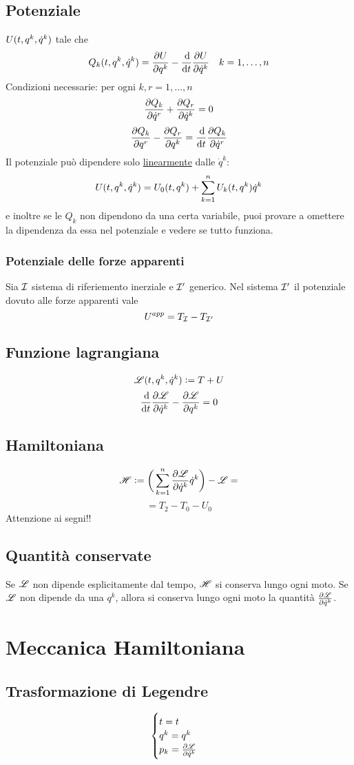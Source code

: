 \documentclass[11pt,landscape,a4paper]{article}
\begin{document}
\begin{multicols}{3}
    \subsection{Potenziale}
        $U (t, q^k, \dot q ^k)$ tale che $$ Q_k \diptre = \de{U}{q^k} - \ddt{}\de{U}{\dot q ^k} \quad k = 1,\dots,n$$
        Condizioni necessarie: per ogni $k,r = 1,\dots, n$
        $$ \frac{\partial Q_k}{\partial \dot q^r} + \frac{\partial Q_r}{\partial \dot q^k} = 0$$
        $$\de{Q_k}{q^r} - \de{Q_r}{q^k} = \ddt{}\de{Q_k}{\dot q^r}$$
        Il potenziale può dipendere solo \underline{linearmente} dalle $\dot q ^k$:
        $$ U (t, q^k, \dot q ^k) = U_0 (t, q^k) + \sum_{k=1}^n U_k (t, q^k) \dot q^k$$
        e inoltre se le $Q_k$ non dipendono da una certa variabile, puoi provare a omettere la dipendenza da essa nel potenziale e vedere se tutto funziona.
        \subsubsection{Potenziale delle forze apparenti}
        Sia $\mathcal{I}$ sistema di riferiemento inerziale e $\mathcal{I}'$ generico. Nel sistema $\mathcal{I}'$ il potenziale dovuto alle forze apparenti vale
        $$ U^{app} = T_{\mathcal{I}} - T_{\mathcal{I}'}$$
    \subsection{Funzione lagrangiana}
        $$ \mathscr{L} (t, q^k, \dot q ^k) := T + U$$
        $$ \ddt{}\de{\Lag}{\dot q^k} - \de{\Lag}{q^k} = 0$$
    \subsection{Hamiltoniana}
        $$ \mathscr{H} := \bigg(\sum_{k=1}^n \frac{\partial \mathscr{L}}{\partial \dot q^k} \dot q^k \bigg) - \mathscr{L} = $$
        $$ = T_2 - T_0 - U_0$$
        Attenzione ai segni!!
    \subsection{Quantità conservate}
        Se $\mathscr{L}$ non dipende esplicitamente dal tempo, $\mathscr{H}$ si conserva lungo ogni moto. Se $\mathscr{L}$ non dipende da una $q^k$, allora si conserva lungo ogni moto la quantità $\frac{\partial \mathscr{L}}{\partial \dot q^k}$.
\section{Meccanica Hamiltoniana}
    \subsection{Trasformazione di Legendre}
        $$ \begin{cases}
            t = t\\
            q^k = q^k\\
            p_k = \frac{\partial \mathscr{L}}{\partial \dot q^k}
        \end{cases}$$

\end{multicols}
\end{document}
